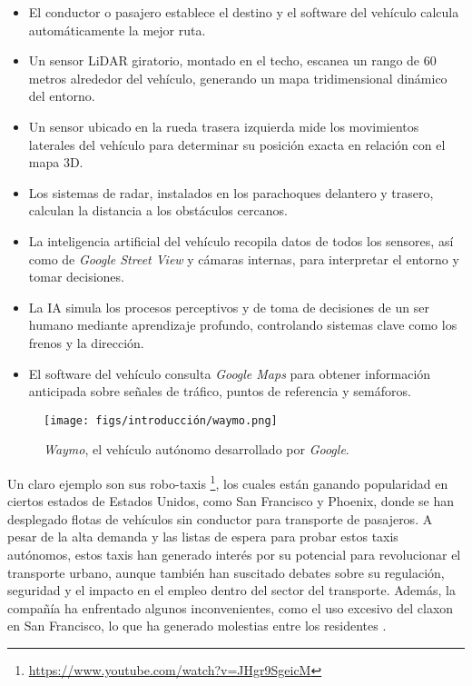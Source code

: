 \begin{itemize}
    \item El conductor o pasajero establece el destino y el software del vehículo calcula automáticamente la mejor ruta.
    \item Un sensor \ac{LiDAR} giratorio, montado en el techo, escanea un rango de 60 metros alrededor del vehículo, generando un mapa tridimensional dinámico del entorno.
    \item Un sensor ubicado en la rueda trasera izquierda mide los movimientos laterales del vehículo para determinar su posición exacta en relación con el mapa 3D.
    \item Los sistemas de radar, instalados en los parachoques delantero y trasero, calculan la distancia a los obstáculos cercanos.
    \item La inteligencia artificial del vehículo recopila datos de todos los sensores, así como de \textit{Google Street View} y cámaras internas, para interpretar el entorno y tomar decisiones.
    \item La \ac{IA} simula los procesos perceptivos y de toma de decisiones de un ser humano mediante aprendizaje profundo, controlando sistemas clave como los frenos y la dirección.
    \item El software del vehículo consulta \textit{Google Maps} para obtener información anticipada sobre señales de tráfico, puntos de referencia y semáforos.
\end{itemize}

\begin{figure}[ht]
  \begin{center}
    \texttt{[image: figs/introducción/waymo.png]}
  \end{center}
  \caption{\textit{Waymo}, el vehículo autónomo desarrollado por \textit{Google}.}
  \label{waymo}
\end{figure}

Un claro ejemplo son sus robo-taxis \footnote{\url{https://www.youtube.com/watch?v=JHgr9SgeicM}}, los cuales están ganando popularidad en ciertos estados de Estados Unidos, como San Francisco y Phoenix, donde se han desplegado flotas de vehículos sin conductor para transporte de pasajeros.  A pesar de la alta demanda y las listas de espera para probar estos taxis autónomos, estos taxis han generado interés por su potencial para revolucionar el transporte urbano, aunque también han suscitado debates sobre su regulación, seguridad y el impacto en el empleo dentro del sector del transporte. Además, la compañía ha enfrentado algunos inconvenientes, como el uso excesivo del claxon en San Francisco, lo que ha generado molestias entre los residentes \cite{robotaxis-waymo}. 

